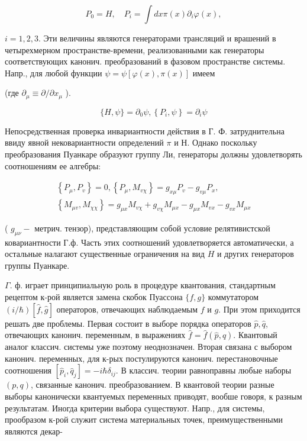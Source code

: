 \documentclass[10pt]{article}
\begin{document}
\[

P_{0}=H, \quad P_{i}=\int d x \pi(x) \partial_{i} \varphi(x),

\]



$i=1,2,3$. Эти величины являются генераторами трансляций и врашений в четырехмерном пространстве-времени, реализованными как генераторы соответствующих канонич. преобразований в фазовом пространстве системы. Напр., для любой функции $\psi=\psi[\varphi(x), \pi(x)]$ имеем



(где $\partial_{\mu} \equiv \partial / \partial x_{\mu}$ ).



\[

\{H, \psi\}=\partial_{0} \psi,\left\{P_{i}, \psi\right\}=\partial_{i} \psi

\]



Непосредственная проверка инвариантности действия в Г. Ф. затруднительна ввиду явной нековариантности определений $\pi$ и $Н$. Однако поскольку преобразования Пуанкаре образуют группу Ли, генераторы должны удовлетворять соотношениям ее алгебры:



\[

\begin{gathered}

\left\{P_{\mu}, P_{v}\right\}=0,\left\{P_{\mu}, M_{v \chi}\right\}=g_{x \mu} P_{v}-g_{v \mu} P_{x}, \\

\left\{M_{\mu v}, M_{\chi \chi}\right\}=g_{\mu x} M_{v \chi}+g_{v \chi} M_{\mu x}-g_{\mu x} M_{v x}-g_{v x} M_{\mu x}

\end{gathered}

\]



( $g_{\mu \nu}-$ метрич. тензор), представляющим собой условие релятивистской ковариантности Г.ф. Часть этих соотношений удовлетворяется автоматически, а остальные налагают существенные ограничения на вид $H$ и других генераторов группы Пуанкаре.



$\Gamma$. ф. играет принципиальную роль в процедуре квантования, стандартным рецептом к-рой является замена скобок Пуассона $\{f, g\}$ коммутатором $(i / \hbar)[\hat{f}, \hat{g}]$ операторов, отвечающих наблюдаемым $f$ и $g$. При этом приходится решать две проблемы. Первая состоит в выборе порядка операторов $\hat{p}, \hat{q}$, отвечающих канонич. переменным, в выражениях $\hat{f}=\hat{f}(\hat{p}, \hat{q})$. Квантовый аналог классич. системы уже поэтому неоднозначен. Вторая связана с выбором канонич. переменных, для к-рых постулируются канонич. перестановочные соотношения $\left[\hat{p}_{i}, \hat{q}_{j}\right]=-i \hbar \delta_{i j}$. В классич. теории равноправны любые наборы $(p, q)$, связанные канонич. преобразованием. В квантовой теории разные выборы канонически квантуемых переменных приводят, вообше говоря, к разным результатам. Иногда критерии выбора существуют. Напр., для системы, прообразом к-рой служит система материальных точек, преимущественными являются декар-
\end{document}
